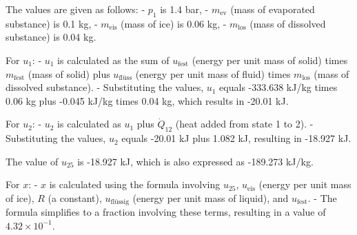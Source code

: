 The values are given as follows:
- \( p_1 \) is 1.4 bar,
- \( m_{\text{ev}} \) (mass of evaporated substance) is 0.1 kg,
- \( m_{\text{eis}} \) (mass of ice) is 0.06 kg,
- \( m_{\text{los}} \) (mass of dissolved substance) is 0.04 kg.

For \( u_1 \):
- \( u_1 \) is calculated as the sum of \( u_{\text{fest}} \) (energy per unit mass of solid) times \( m_{\text{fest}} \) (mass of solid) plus \( u_{\text{flüss}} \) (energy per unit mass of fluid) times \( m_{\text{los}} \) (mass of dissolved substance).
- Substituting the values, \( u_1 \) equals -333.638 kJ/kg times 0.06 kg plus -0.045 kJ/kg times 0.04 kg, which results in -20.01 kJ.

For \( u_2 \):
- \( u_2 \) is calculated as \( u_1 \) plus \( \dot{Q}_{12} \) (heat added from state 1 to 2).
- Substituting the values, \( u_2 \) equals -20.01 kJ plus 1.082 kJ, resulting in -18.927 kJ.

The value of \( u_{25} \) is -18.927 kJ, which is also expressed as -189.273 kJ/kg.

For \( x \):
- \( x \) is calculated using the formula involving \( u_{25} \), \( u_{\text{eis}} \) (energy per unit mass of ice), \( R \) (a constant), \( u_{\text{flüssig}} \) (energy per unit mass of liquid), and \( u_{\text{fest}} \).
- The formula simplifies to a fraction involving these terms, resulting in a value of \( 4.32 \times 10^{-1} \).